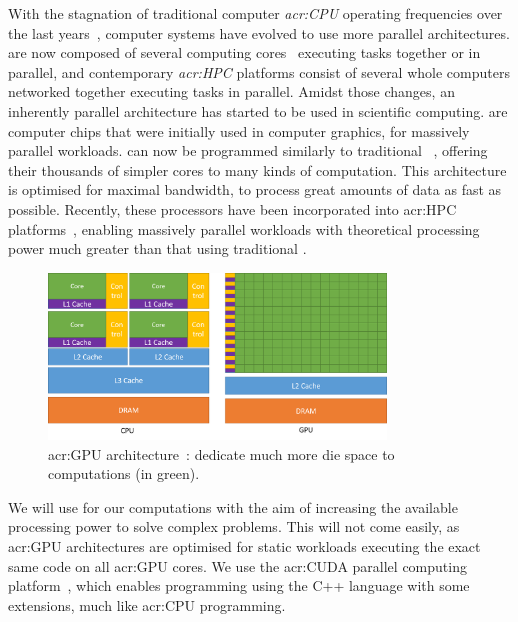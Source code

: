 With the stagnation of traditional computer \textit{\acrfull{acr:CPU}} operating frequencies over
the last years~\cite{Parkhurst2006}, computer systems have evolved to use more parallel
architectures.  are now composed of several computing cores~\cite{Nayfeh1997}
executing tasks together or in parallel, and contemporary \textit{\acrfull{acr:HPC}} platforms
consist of several whole computers networked together executing tasks in parallel. Amidst those
changes, an inherently parallel architecture has started to be used in scientific computing.
\textit{} are computer chips that were initially used in computer graphics, for
massively parallel workloads.  can now be programmed similarly to traditional
~\cite{Owens2008}, offering their thousands of simpler cores to many kinds of
computation. This architecture is optimised for maximal bandwidth, to process great amounts of data
as fast as possible. Recently, these processors have been incorporated into \acrshort{acr:HPC}
platforms~\cite{Fan2004}, enabling massively parallel workloads with theoretical processing power
much greater than that using traditional .

\begin{figure}[H]
	\centering
	\includegraphics[width=0.8\textwidth]{Chapter_introduction/media/gpu-devotes-more-transistors-to-data-processing}
	\caption{\Acrshort{acr:GPU} architecture~\cite{Nvidia2021}:  dedicate much more die space to computations (in green).}\label{fig:intro_gpu}
\end{figure}

We will use  for our computations with the aim of increasing the available
processing power to solve complex problems. This will not come easily, as \acrshort{acr:GPU}
architectures are optimised for static workloads executing the exact same code on all
\acrshort{acr:GPU} cores. We use the \acrshort{acr:CUDA} parallel computing
platform~\cite{Garland2008}, which enables programming  using the C++ language
with some extensions, much like \acrshort{acr:CPU} programming.

